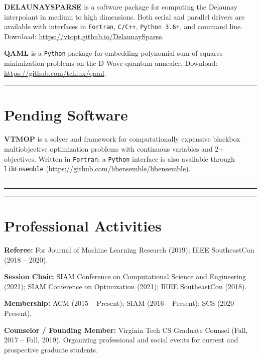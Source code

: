 \documentclass[12pt]{article}
\def\hrulefull{\noindent\rule{\textwidth}{0.2pt}}
\begin{document}
\textbf{DELAUNAYSPARSE} is a software package for computing the Delaunay
interpolant in medium to high dimensions.
Both serial and parallel drivers are available with interfaces in
\texttt{Fortran},
\texttt{C/C++},
\texttt{Python 3.6+},
and command line.
Download: \url{https://vtopt.github.io/DelaunaySparse}.

\textbf{QAML} is a \texttt{Python} package for embedding polynomial sum of
squares minimization problems on the D-Wave quantum annealer.
Download: \url{https://github.com/tchlux/qaml}.

\medskip
\hrulefull
\section*{Pending Software}

\textbf{VTMOP} is a solver and framework for computationally
expensive blackbox multiobjective optimization problems with continuous
variables and 2+ objectives.
Written in \texttt{Fortran}; a \texttt{Python} interface is also available
through \texttt{libEnsemble} (\url{https://github.com/libensemble/libensemble}).


\medskip
\hrulefull
{}

\newpage
{}

\medskip
\hrulefull
{}

\medskip
\hrulefull
{}

\newpage
\section*{Professional Activities}

\textbf{Referee:} For
Journal of Machine Learning Research (2019);
IEEE SoutheastCon (2018 -- 2020).

\textbf{Session Chair:}
SIAM Conference on Computational Science and Engineering (2021);
SIAM Conference on Optimization (2021); IEEE SoutheastCon (2018).

\textbf{Membership:}
ACM (2015 -- Present); SIAM (2016 -- Present); SCS (2020 -- Present).

\textbf{Counselor / Founding Member:} Virginia Tech CS Graduate Counsel 
(Fall, 2017 -- Fall, 2019).
Organizing professional and social events for
current and prospective graduate students.
\end{document}
